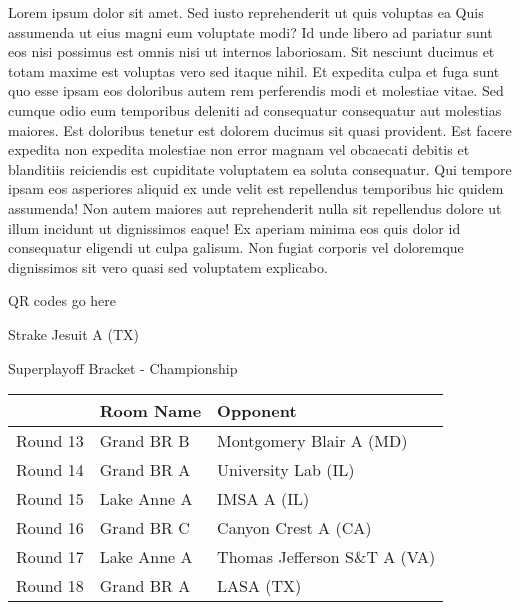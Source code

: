 \documentclass{article}%
\begin{document}
\vspace*{8pt}%
\linebreak%
\newline%
\newline%
Lorem ipsum dolor sit amet. Sed iusto reprehenderit ut quis voluptas ea Quis assumenda ut eius magni eum voluptate modi? Id unde libero ad pariatur sunt eos nisi possimus est omnis nisi ut internos laboriosam. Sit nesciunt ducimus et totam maxime est voluptas vero sed itaque nihil. Et expedita culpa et fuga sunt quo esse ipsam eos doloribus autem rem perferendis modi et molestiae vitae.\newline%
\newline%
Sed cumque odio eum temporibus deleniti ad consequatur consequatur aut molestias maiores. Est doloribus tenetur est dolorem ducimus sit quasi provident. Est facere expedita non expedita molestiae non error magnam vel obcaecati debitis et blanditiis reiciendis est cupiditate voluptatem ea soluta consequatur. Qui tempore ipsam eos asperiores aliquid ex unde velit est repellendus temporibus hic quidem assumenda!\newline%
\newline%
Non autem maiores aut reprehenderit nulla sit repellendus dolore ut illum incidunt ut dignissimos eaque! Ex aperiam minima eos quis dolor id consequatur eligendi ut culpa galisum. Non fugiat corporis vel doloremque dignissimos sit vero quasi sed voluptatem explicabo.\newline%
\newline%
%
\vspace*{30pt}%
\begin{center}%
\begin{Huge}%
QR codes go here%
\end{Huge}%
\end{center}%
\newpage%
\begin{center}%
\begin{Huge}%
Strake Jesuit A (TX)%
\end{Huge}%
\vspace*{8pt}%
\linebreak%
\begin{Large}%
Superplayoff Bracket {-} Championship%
\end{Large}%
\end{center}%
%
\begin{tabularx}{\textwidth}{|c|Y|Y|}%
\hline%
&Room Name&Opponent\\%
\hline%
Round 13&Grand BR B&Montgomery Blair A (MD)\\%
Round 14&Grand BR A&University Lab (IL)\\%
Round 15&Lake Anne A&IMSA A (IL)\\%
Round 16&Grand BR C&Canyon Crest A (CA)\\%
Round 17&Lake Anne A&Thomas Jefferson S\&T A (VA)\\%
Round 18&Grand BR A&LASA (TX)\\%
\hline%
\end{tabularx}%
\end{document}
